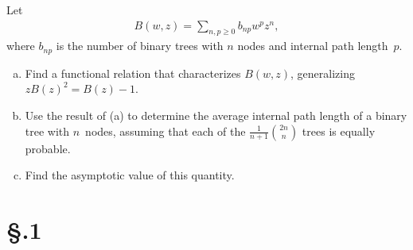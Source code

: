 \documentclass[fontsize=11pt, paper=a4]{scrartcl}
\begin{document}
\parbox{\linewidth}{
    \qquad Let
    \begin{align*}
        B(w,z) = \sum_{n,p\ge0} b_{np}w^{p}z^{n},
    \end{align*}
    where $b_{np}$ is the number of binary trees with $n$ nodes and internal path length\ 
    $p$.}
\begin{enumerate}[(a), leftmargin=1.5cm]
    \item Find a functional relation that characterizes $B(w,z)$, generalizing $zB(z)^{2} = B(z) - 1$.
    \item Use the result of (a) to determine the average internal path length of a binary tree with $n$\ 
            nodes, assuming that each of the $\frac{1}{n+1} \binom{2n}{n}$ trees is equally probable.
    \item Find the asymptotic value of this quantity.
\end{enumerate}


\section*{\S {}.1}\label{part: 6.2.1}
\end{document}
